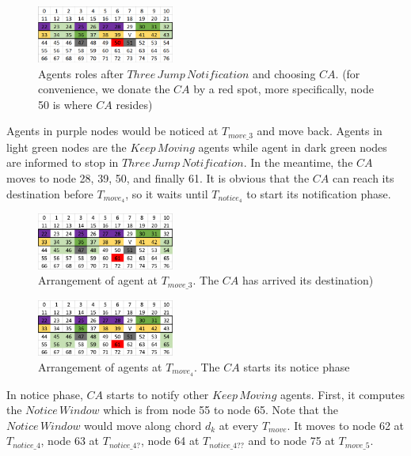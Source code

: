 \documentclass[conference]{IEEEtran}
\begin{document}
\begin{figure}[H]
  \centering  
  \includegraphics[width=0.4\textwidth]{figures/T50.png}
  \caption{Agents roles after $Three\,Jump\,Notification$ and choosing $CA$. (for convenience, we donate the $CA$ by a red spot, more specifically, node 50 is where $CA$ resides)}\label{fig:T50}
\end{figure}

Agents in purple nodes would be noticed at $T_{move\_3}$ and move back. Agents in light green nodes are the $Keep\,Moving$ agents while agent in dark green nodes are informed to stop in $Three\,Jump\,Notification$. In the meantime, the $CA$ moves to node 28, 39, 50, and finally 61. It is obvious that the $CA$ can reach its destination before $T_{move_4}$, so it waits until $T_{notice_4}$ to start its notification phase. 

\begin{figure}[H]
  \centering  
  \includegraphics[width=0.4\textwidth]{figures/T611.png}
  \caption{Arrangement of agent at $T_{move\_3}$. The $CA$ has arrived its destination)}\label{fig:T611}
\end{figure}

\begin{figure}[H]
  \centering  
  \includegraphics[width=0.4\textwidth]{figures/T612.png}
  \caption{Arrangement of agents at $T_{move_4}$. The $CA$ starts its notice phase}\label{fig:T612}
\end{figure}
In notice phase, $CA$ starts to notify other $Keep\,Moving$ agents. First, it computes the $Notice\,Window$ which is from node 55 to node 65. Note that the $Notice\,Window$ would move along chord $d_k$ at every $T_{move}$. It moves to node 62 at $T_{notice\_4}$, node 63 at $T_{notice\_4?}$, node 64 at $T_{notice\_4??}$ and to node 75 at $T_{move\_5}$.
\end{document}
